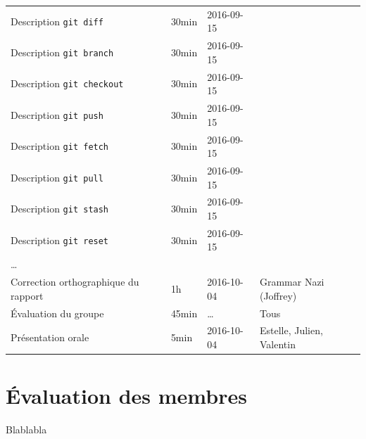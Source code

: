 \documentclass[11pt,canadien]{article}
\begin{document}
\begin{appendices}
\begin{tabular}{l l l l}
	\\ Description \texttt{git diff}        & 30min & 2016-09-15 & \karen
	\\ Description \texttt{git branch}      & 30min & 2016-09-15 & \karen
	\\ Description \texttt{git checkout}    & 30min & 2016-09-15 & \karen
	\\ Description \texttt{git push}        & 30min & 2016-09-15 & \kevin
	\\ Description \texttt{git fetch}       & 30min & 2016-09-15 & \kevin
	\\ Description \texttt{git pull}        & 30min & 2016-09-15 & \kevin
	\\ Description \texttt{git stash}       & 30min & 2016-09-15 & \antoine
	\\ Description \texttt{git reset}       & 30min & 2016-09-15 & \antoine
	\\ \ldots
	\\ Correction orthographique du rapport & 1h    & 2016-10-04 & Grammar Nazi (Joffrey)
	\\ Évaluation du groupe                 & 45min & \ldots     & Tous
	\\ Présentation orale                   & 5min  & 2016-10-04 & Estelle, Julien, Valentin
\end{tabular}

\section{Évaluation des membres}
Blablabla

\end{appendices}
\end{document}
